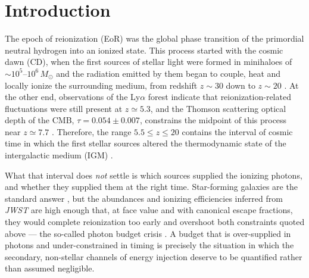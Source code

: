 
\section{Introduction}

The epoch of reionization (EoR) was the global phase transition of the
primordial neutral hydrogen into an ionized state. This process started with
the cosmic dawn (CD), when the first sources of stellar light were formed in
minihaloes of $\sim\!10^{5}$--$10^{6}\,M_{\odot}$ and the radiation emitted by
them began to couple, heat and locally ionize the surrounding medium, from
redshift $z \sim 30$ down to $z \sim 20$ \citep{Bromm2013,Klessen2023}. At the
other end, observations of the Ly$\alpha$ forest indicate that
reionization-related fluctuations were still present at $z \simeq 5.3$, and the
Thomson scattering optical depth of the CMB, $\tau = 0.054 \pm 0.007$,
constrains the midpoint of this process near $z \simeq 7.7$
\citep{Bosman2022,Planck2020}. Therefore, the range $5.5 \le z \le 20$ contains
the interval of cosmic time in which the first stellar sources altered the
thermodynamic state of the intergalactic medium (IGM)
\citep{Robertson2022,Klessen2023}.

What that interval does \emph{not} settle is which sources supplied the
ionizing photons, and whether they supplied them at the right time.
Star-forming galaxies are the standard answer \citep{Robertson2022}, but the
abundances and ionizing efficiencies inferred from \emph{JWST} are high enough
that, at face value and with canonical escape fractions, they would complete
reionization too early and overshoot both constraints quoted above --- the
so-called photon budget crisis \citep{Munoz2024}. A budget that is
over-supplied in photons and under-constrained in timing is precisely the
situation in which the secondary, non-stellar channels of energy injection
deserve to be quantified rather than assumed negligible.

